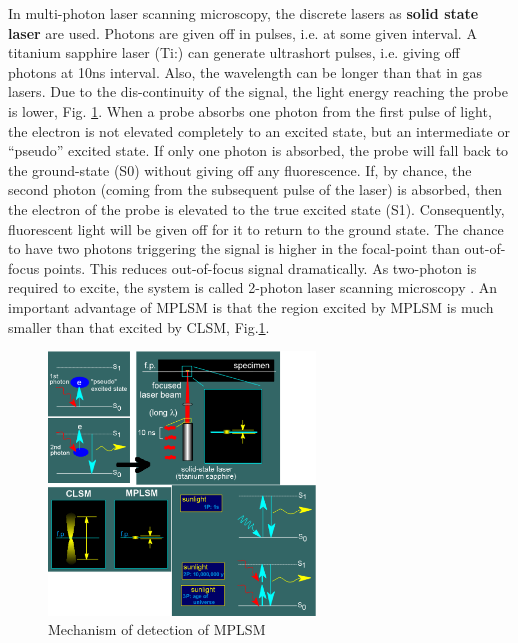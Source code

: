 In multi-photon laser scanning microscopy, the discrete lasers as {\bf solid
state laser} are used. Photons are given off in pulses, i.e. at some given
interval. A titanium sapphire laser (Ti:) can generate ultrashort
pulses, i.e. giving off photons at 10ns interval. Also, the wavelength can be
longer than that in gas lasers. Due to the dis-continuity of the signal, the
light energy reaching the probe is lower, Fig. \ref{fig:MLSM_mechanism}. When a
probe absorbs one photon from the first pulse of light, the electron is not
elevated completely to an excited state, but an intermediate or ``pseudo''
excited state. If only one photon is absorbed, the probe will fall back to the
ground-state (S0) without giving off any fluorescence. If, by chance, the second
photon (coming from the subsequent pulse of the laser) is absorbed, then the
electron of the probe is elevated to the true excited state (S1). Consequently,
fluorescent light will be given off for it to return to the ground state. The
chance to have two photons triggering the signal is higher in the focal-point
than out-of-focus points. This reduces out-of-focus signal dramatically. As
two-photon is required to excite, the system is called 2-photon laser scanning
microscopy \citep{helmchen2005}. An important advantage of MPLSM is that the
region excited by MPLSM is much smaller than that excited by CLSM,
Fig.\ref{fig:MLSM_mechanism}. 

\begin{figure}[hbt]
  \centerline{\includegraphics[height=7cm,
  angle=0]{./images/MLSM_mechanism.eps}}
  \caption{Mechanism of detection of MPLSM}
  \label{fig:MLSM_mechanism}
\end{figure}

